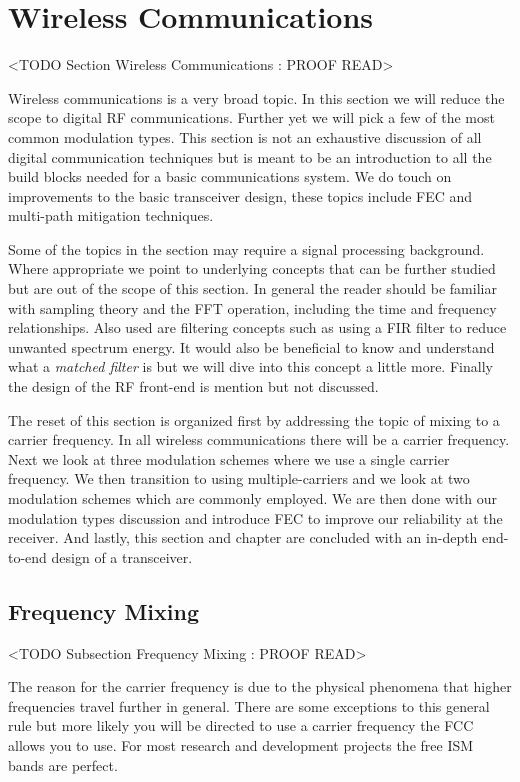 	
\section{Wireless Communications}
	<TODO Section Wireless Communications : PROOF READ>

Wireless communications is a very broad topic. In this section we will reduce the scope to digital \ac{RF} communications. Further yet we will pick a few of the most common modulation types. This section is not an exhaustive discussion of all digital communication techniques but is meant to be an introduction to all the build blocks needed for a basic communications system. We do touch on improvements to the basic transceiver design, these topics include \ac{FEC} and multi-path mitigation techniques.

Some of the topics in the section may require a signal processing background. Where appropriate we point to underlying concepts that can be further studied but are out of the scope of this section. In general the reader should be familiar with sampling theory and the \ac{FFT} operation, including the time and frequency relationships. Also used are filtering concepts such as using a \ac{FIR} filter to reduce unwanted spectrum energy. It would also be beneficial to know and understand what a \emph{matched filter} is but we will dive into this concept a little more. Finally the design of the \ac{RF} front-end is mention but not discussed.

The reset of this section is organized first by addressing the topic of mixing to a carrier frequency. In all wireless communications there will be a carrier frequency. Next we look at three modulation schemes where we use a single carrier frequency. We then transition to using multiple-carriers and we look at two modulation schemes which are commonly employed. We are then done with our modulation types discussion and introduce \ac{FEC} to improve our reliability at the receiver. And lastly, this section and chapter are concluded with an in-depth end-to-end design of a transceiver.

\subsection{Frequency Mixing} 
	<TODO Subsection Frequency Mixing : PROOF READ>	
	
The reason for the carrier frequency is due to the physical phenomena that higher frequencies travel further in general. There are some exceptions to this general rule but more likely you will be directed to use a carrier frequency the \ac{FCC} allows you to use. For most research and development projects the free \ac{ISM} bands are perfect.

